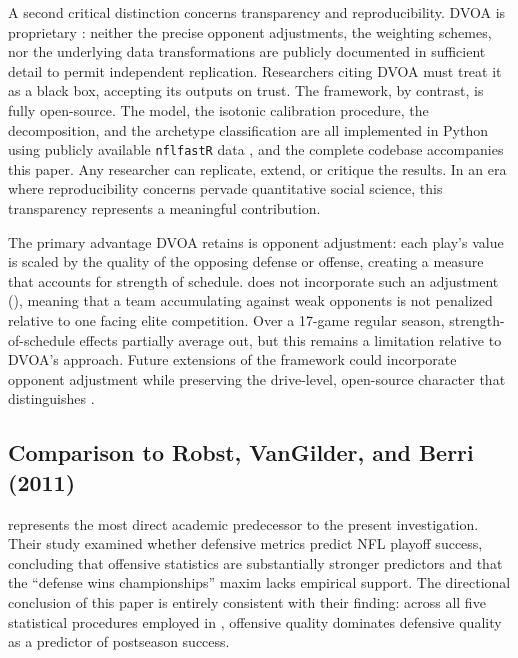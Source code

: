 A second critical distinction concerns transparency and reproducibility. DVOA
is proprietary \parencite{schatz2005dvoa}: neither the precise opponent adjustments, the weighting
schemes, nor the underlying data transformations are publicly documented in
sufficient detail to permit independent replication. Researchers citing DVOA
must treat it as a black box, accepting its outputs on trust. The \gds{}
framework, by contrast, is fully open-source. The \xscore{} model, the
isotonic calibration procedure, the \xvoa{} decomposition, and the archetype
classification are all implemented in Python using publicly available
\texttt{nflfastR} data \parencite{carl2021nflfastr}, and the complete codebase
accompanies this paper. Any researcher can replicate, extend, or critique
the results. In an era where reproducibility concerns pervade quantitative
social science, this transparency represents a meaningful contribution.

The primary advantage DVOA retains is opponent adjustment: each play's value
is scaled by the quality of the opposing defense or offense, creating a
measure that accounts for strength of schedule. \gds{} does not incorporate
such an adjustment (), meaning that a team accumulating
\xvoa{} against weak opponents is not penalized relative to one facing elite
competition. Over a 17-game regular season, strength-of-schedule effects
partially average out, but this remains a limitation relative to DVOA's
approach. Future extensions of the framework could incorporate opponent
adjustment while preserving the drive-level, open-source character that
distinguishes \gds{}.

\subsection{Comparison to Robst, VanGilder, and Berri (2011)}
\label{sec:comparison-robst}

\textcite{robst2011defense} represents the most direct academic predecessor to
the present investigation. Their study examined whether defensive metrics
predict NFL playoff success, concluding that offensive statistics are
substantially stronger predictors and that the ``defense wins championships''
maxim lacks empirical support. The directional conclusion of this paper is
entirely consistent with their finding: across all five statistical procedures
employed in , offensive quality dominates defensive quality as
a predictor of postseason success.

